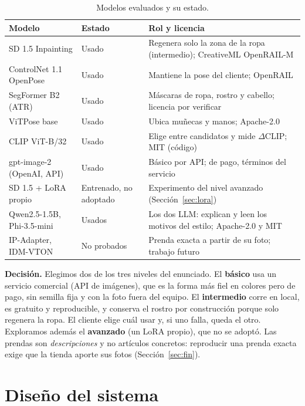 \documentclass[11pt,letterpaper]{article}
\begin{document}
\begin{table}[H]
\centering
\caption{Modelos evaluados y su estado.}
\label{tab:modelos}
\small
\begin{tabularx}{\textwidth}{@{}p{3.9cm}p{2.2cm}L@{}}
\toprule
\textbf{Modelo} & \textbf{Estado} & \textbf{Rol y licencia} \\
\midrule
SD 1.5 Inpainting & Usado & Regenera solo la zona de la ropa (intermedio); CreativeML OpenRAIL-M \\
ControlNet 1.1 OpenPose & Usado & Mantiene la pose del cliente; OpenRAIL \\
SegFormer B2 (ATR) & Usado & Máscaras de ropa, rostro y cabello; licencia por verificar \\
ViTPose base & Usado & Ubica muñecas y manos; Apache-2.0 \\
CLIP ViT-B/32 & Usado & Elige entre candidatos y mide $\Delta$CLIP; MIT (código) \\
gpt-image-2 (OpenAI, API) & Usado & Básico por API; de pago, términos del servicio \\
SD 1.5 + LoRA propio & Entrenado, no adoptado & Experimento del nivel avanzado (Sección~\ref{sec:lora}) \\
Qwen2.5-1.5B, Phi-3.5-mini & Usados & Los dos LLM: explican y leen los motivos del estilo; Apache-2.0 y MIT \\
IP-Adapter, IDM-VTON & No probados & Prenda exacta a partir de su foto; trabajo futuro \\
\bottomrule
\end{tabularx}
\end{table}

\textbf{Decisión.} Elegimos dos de los tres niveles del enunciado. El \textbf{básico} usa un servicio comercial
(API de imágenes), que es la forma más fiel en colores pero de pago, sin semilla fija y con la foto fuera del equipo. El
\textbf{intermedio} corre en local, es gratuito y reproducible, y conserva el rostro por construcción porque solo
regenera la ropa. El cliente elige cuál usar y, si uno falla, queda el otro. Exploramos además el \textbf{avanzado}
(un LoRA propio), que no se adoptó. Las prendas son \emph{descripciones} y no artículos concretos: reproducir una prenda
exacta exige que la tienda aporte sus fotos (Sección~\ref{sec:fin}).

\section{Diseño del sistema}
\label{sec:diseno}
\end{document}
